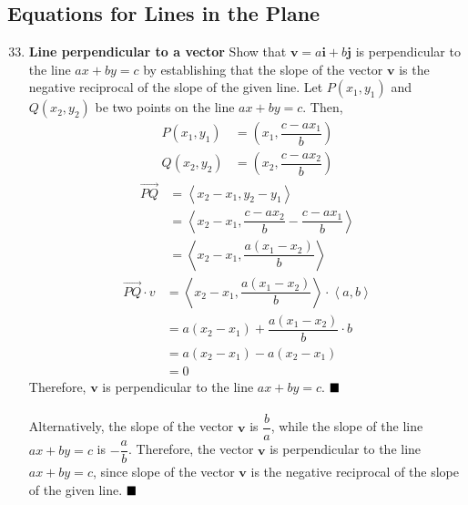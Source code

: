 \subsection*{Equations for Lines in the Plane}

\begin{enumerate}
    \setcounter{enumi}{32}
    \item \textbf{Line perpendicular to a vector} Show that $\mathbf{v}=a \mathbf{i}+b \mathbf{j}$ is perpendicular to the line $a x+b y=c$ by establishing that the slope of the vector $\mathbf{v}$ is the negative reciprocal of the slope of the given line.
          \sol{} Let $P(x_1, y_1)$ and $Q(x_2, y_2)$ be two points on the line $ax + by = c$. Then,
          \begin{align*}
              P(x_1, y_1) & = \left(x_1, \dfrac{c - ax_1}{b}\right) \\
              Q(x_2, y_2) & = \left(x_2, \dfrac{c - ax_2}{b}\right)
          \end{align*}
          \begin{align*}
              \overrightarrow{PQ} & = \left\langle x_2 - x_1, y_2 - y_1 \right\rangle                                 \\
                                  & = \left\langle x_2 - x_1, \dfrac{c - ax_2}{b} - \dfrac{c - ax_1}{b} \right\rangle \\
                                  & = \left\langle x_2 - x_1, \dfrac{a(x_1 - x_2)}{b} \right\rangle
          \end{align*}
          \begin{align*}
              \overrightarrow{PQ} \cdot v & = \left\langle x_2 - x_1, \dfrac{a(x_1 - x_2)}{b} \right\rangle \cdot \left\langle a, b \right\rangle \\
                                          & = a(x_2 - x_1) + \dfrac{a(x_1 - x_2)}{b} \cdot b                                                      \\
                                          & = a(x_2 - x_1) - a(x_2 - x_1)                                                                         \\
                                          & = 0
          \end{align*}
          Therefore, $\mathbf{v}$ is perpendicular to the line $ax + by = c$. $\hfill\blacksquare$
          ~\\\\
          Alternatively, the slope of the vector $\mathbf{v}$ is $\dfrac{b}{a}$, while
          the slope of the line $ax + by = c$ is $-\dfrac{a}{b}$. Therefore, the vector
          $\mathbf{v}$ is perpendicular to the line $ax + by = c$, since slope of the vector $\mathbf{v}$ is the negative reciprocal of the slope of the given line. $\hfill\blacksquare$


\end{enumerate}
